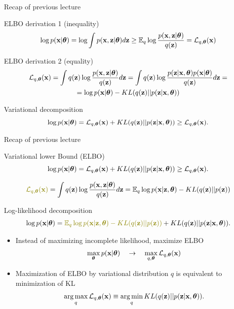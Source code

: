 \begin{frame}{Recap of previous lecture}
	\begin{block}{ELBO derivation 1 (inequality)}
		\vspace{-0.3cm}
		\begin{multline*}
			\log p(\mathbf{x}| \boldsymbol{\theta}) 
			= \log \int p(\mathbf{x}, \mathbf{z} | \boldsymbol{\theta}) d\mathbf{z} \geq \mathbb{E}_{q} \log \frac{p(\mathbf{x}, \mathbf{z}| \boldsymbol{\theta})}{q(\mathbf{z})} = \mathcal{L}_{q, \boldsymbol{\theta}}(\mathbf{x})
		\end{multline*}
		\vspace{-0.3cm}
	\end{block}
	\begin{block}{ELBO derivation 2 (equality)}
		\vspace{-0.3cm}
		\begin{multline*}
			\mathcal{L}_{q, \boldsymbol{\theta}}(\mathbf{x}) = \int q(\mathbf{z}) \log \frac{p(\mathbf{x}, \mathbf{z} | \boldsymbol{\theta})}{q(\mathbf{z})}d\mathbf{z} = 
			\int q(\mathbf{z}) \log \frac{p(\mathbf{z}|\mathbf{x}, \boldsymbol{\theta})p(\mathbf{x}| \boldsymbol{\theta})}{q(\mathbf{z})}d\mathbf{z} = \\
			= \log p(\mathbf{x}| \boldsymbol{\theta}) - KL(q(\mathbf{z}) || p(\mathbf{z}|\mathbf{x}, \boldsymbol{\theta}))
		\end{multline*}
	\end{block}
	\vspace{-0.3cm}
	\begin{block}{Variational decomposition}
		\[
		\log p(\mathbf{x}| \boldsymbol{\theta}) = \mathcal{L}_{q, \boldsymbol{\theta}}(\mathbf{x}) + KL(q(\mathbf{z}) || p(\mathbf{z}|\mathbf{x}, \boldsymbol{\theta})) \geq \mathcal{L}_{q, \boldsymbol{\theta}}(\mathbf{x}).
		\]
	\end{block}
\end{frame}
\begin{frame}{Recap of previous lecture}
	\begin{block}{Variational lower Bound (ELBO)}
		\vspace{-0.3cm}
		\[
			\log p(\mathbf{x}| \boldsymbol{\theta}) = \mathcal{L}_{q, \boldsymbol{\theta}}(\mathbf{x}) + KL(q(\mathbf{z}) || p(\mathbf{z}|\mathbf{x}, \boldsymbol{\theta})) \geq \mathcal{L}_{q, \boldsymbol{\theta}}(\mathbf{x}).
		\]
	\end{block}
	
	\vspace{-0.5cm}
	\[
	 	{\color{olive}\cL_{q, \btheta}(\bx)} = \int q(\bz) \log \frac{p(\bx, \bz | \btheta)}{q(\bz)}d\bz = \mathbb{E}_{q} \log p(\bx | \bz, \btheta) - KL (q(\bz) || p(\bz))
	\]
	\vspace{-0.3cm}
	\begin{block}{Log-likelihood decomposition}
		\vspace{-0.5cm}
		\[
	 \log p(\bx| \btheta) = {\color{olive}\mathbb{E}_{q} \log p(\bx | \bz, \btheta) - KL (q(\bz) || p(\bz))} + KL(q(\bz) || p(\bz|\bx, \btheta)).
		\]
	\end{block}
	\begin{itemize}
	\item Instead of maximizing incomplete likelihood, maximize ELBO
   	\[
\max_{\boldsymbol{\theta}} p(\mathbf{x} | \boldsymbol{\theta}) \quad \rightarrow \quad \max_{q, \boldsymbol{\theta}} \mathcal{L}_{q, \boldsymbol{\theta}}(\mathbf{x})
   	\]
   	\item Maximization of ELBO by variational distribution $q$ is equivalent to minimization of KL
  	\[
\operatorname*{arg\,max}_q \mathcal{L}_{q, \boldsymbol{\theta}}(\mathbf{x}) \equiv \operatorname*{arg\,min}_q KL(q(\mathbf{z}) || p(\mathbf{z}|\mathbf{x}, \boldsymbol{\theta})).
  	\]
  	\end{itemize}
  	    
\end{frame}
